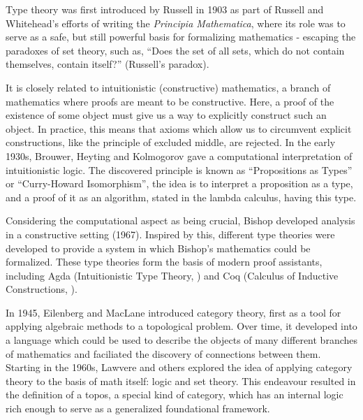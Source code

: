 

Type theory was first introduced by Russell in 1903 \citep{kamareddine2002} as
part of Russell and Whitehead's efforts of writing the \textit{Principia
  Mathematica}, where its role was to serve as a safe, but still powerful basis for formalizing mathematics -
escaping the paradoxes of set theory, such as, ``Does the set of all sets, which do not
contain themselves, contain itself?'' (Russell's paradox). \citep{ConstableManuscript}

\medskip

It is closely related to intuitionistic (constructive) mathematics, a branch of
mathematics where proofs are meant to be constructive. Here, a proof of the existence
of some object must give us a way to explicitly construct such an object. In
practice, this means that axioms which allow us to circumvent explicit
constructions, like the principle of excluded middle, are rejected. In the early
1930s, Brouwer, Heyting and Kolmogorov gave a computational interpretation of
intuitionistic logic. The discovered principle is known as ``Propositions as
Types'' or ``Curry-Howard Isomorphism'', the idea is to interpret a proposition
as a type, and a proof of it as an algorithm, stated in the lambda calculus, having this type.

Considering the computational aspect as being crucial, Bishop developed analysis in a
constructive setting (1967). Inspired by this, different type theories were
developed to provide a system in which Bishop's mathematics could be
formalized. These type theories form the basis of modern proof assistants,
including Agda (Intuitionistic Type Theory, \citep{ITT}) and Coq
(Calculus of Inductive Constructions, \citep{CIC}). \citep{ConstableManuscript}

\medskip

In 1945, Eilenberg and MacLane introduced category theory, first as a tool for
applying algebraic methods to a topological problem. Over time, it developed
into a language which could be used to describe the objects of many different
branches of mathematics and faciliated the discovery of connections between
them. Starting in the 1960s, Lawvere and others explored the idea of applying
category theory to the basis of math itself: logic and set theory.
This endeavour resulted in the definition of a topos, a special kind of
category, which has an internal logic rich enough to serve as a generalized
foundational framework. \citep{LandryMarquis}

\medskip


